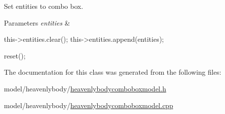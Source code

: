 \-Set entities to combo box. 


\begin{DoxyParams}{\-Parameters}
{\em entities} & \\
\hline
\end{DoxyParams}

\begin{DoxyCode}
{
    this->entities.clear();
    this->entities.append(entities);

    reset();
}
\end{DoxyCode}


\-The documentation for this class was generated from the following files\-:\begin{DoxyCompactItemize}
\item 
model/heavenlybody/\hyperlink{heavenlybodycomboboxmodel_8h}{heavenlybodycomboboxmodel.\-h}\item 
model/heavenlybody/\hyperlink{heavenlybodycomboboxmodel_8cpp}{heavenlybodycomboboxmodel.\-cpp}\end{DoxyCompactItemize}

